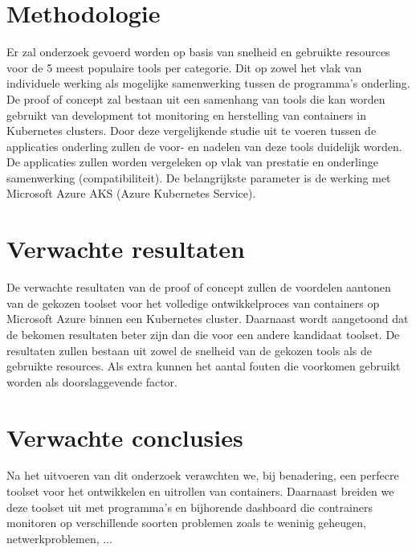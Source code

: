 \section{Methodologie}
\label{sec:methodologie}

Er zal onderzoek gevoerd worden op basis van snelheid en gebruikte resources voor de 5 meest populaire tools per categorie. Dit op zowel het vlak van individuele werking als mogelijke samenwerking tussen de programma's onderling. De proof of concept zal bestaan uit een samenhang van tools die kan worden gebruikt van development tot monitoring en herstelling van containers in Kubernetes clusters. Door deze vergelijkende studie uit te voeren tussen de applicaties onderling zullen de voor- en nadelen van deze tools duidelijk worden. De applicaties zullen worden vergeleken op vlak van prestatie en onderlinge samenwerking (compatibiliteit). De belangrijkste parameter is de werking met Microsoft Azure AKS (Azure Kubernetes Service).


\section{Verwachte resultaten}
\label{sec:verwachte_resultaten}

De verwachte resultaten van de proof of concept zullen de voordelen aantonen van de gekozen toolset voor het volledige ontwikkelproces van containers op Microsoft Azure binnen een Kubernetes cluster. Daarnaast wordt aangetoond dat de bekomen resultaten beter zijn dan die voor een andere kandidaat toolset. De resultaten zullen bestaan uit zowel de snelheid van de gekozen tools als de gebruikte resources. Als extra kunnen het aantal fouten die voorkomen gebruikt worden als doorslaggevende factor.


\section{Verwachte conclusies}
\label{sec:verwachte_conclusies}

Na het uitvoeren van dit onderzoek verawchten we, bij benadering, een perfecre toolset voor het ontwikkelen en uitrollen van containers. Daarnaast breiden we deze toolset uit met programma's en bijhorende dashboard die contrainers monitoren op verschillende soorten problemen zoals te weninig geheugen, netwerkproblemen, ... 

